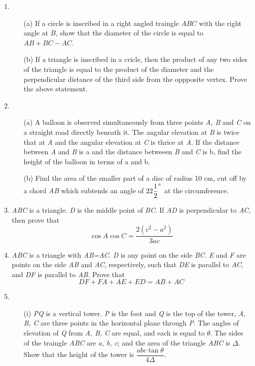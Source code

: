 \documentclass[journal,12pt,twocolumn]{IEEEtran}
\begin{document}
\begin{enumerate}
 \item \begin{itemize}
 \item[(a)] If a circle is inscribed in a right angled traingle $ABC$ with the right angle at $B$, show that the diameter of the circle is equal to $AB+BC-AC$.
 \item[(b)] If a triangle is inscribed in a cricle, then the product of any two sides of the triangle is equal to the product of the diameter and the perpendicular distance of the third side from the oppposite vertex. Prove the above statement.
 \end{itemize}
 \item \begin{itemize}
 \item[(a)] A balloon is observed simultaneously from three points \textsl{A, B} and \textsl{C} on a straight road directly beneath it. The angular elevation at \textsl{B} is twice that at \textsl{A} and the angular elevation at \textsl{C} is thrice at \textsl{A}. If the distance between \textsl{A} and \textsl{B} is a and the distance betweeen \textsl{B} and \textsl{C} is b, find the height of the balloon in terms of a and b.
 \item[(b)] Find the area of the smaller part of a disc of radius 10 cm, cut off by a chord \textsl{AB} which subtends an angle of $22\dfrac{1}{2}\degree$ at the circumference.
 \end{itemize}
 \item \textsl{ABC} is a triangle. \textsl{D} is the middle point of \textsl{BC}. If \textsl{AD} is perpendicular to \textsl{AC}, then prove that
 \begin{equation*}
 \cos A \cos C=\dfrac{2\left(c^2-a^2\right)}{3ac}
 \end{equation*}
 \item \textsl{ABC} is a triangle with \textsl{AB=AC}. \textsl{D} is any point on the side \textsl{BC}. \textsl{E} and \textsl{F} are points on the side \textsl{AB} and \textsl{AC}, respectively, such that \textsl{DE} is parallel to \textsl{AC}, and \textsl{DF} is parallel to \textsl{AB}. Prove that
 \begin{equation*}
 DF+FA+AE+ED=AB+AC
 \end{equation*}
 \item \begin{itemize}
 \item[(i)] \textsl{PQ} is a vertical tower. \textsl{P} is the foot and \textsl{Q} is the top of the tower, \textsl{A, B, C} are three points in the horizontal plane through \textsl{P}. The angles of elevation of \textsl{Q} from \textsl{A, B, C} are equal, and each is equal to $\theta$. The sides of the traingle \textsl{ABC} are \textsl{a, b, c}; and the area of the triangle \textsl{ABC} is $\Delta$. Show that the height of the tower is $\dfrac{abc\tan\theta}{4\Delta}$. 

\end{itemize}
\end{enumerate}
\end{document}
